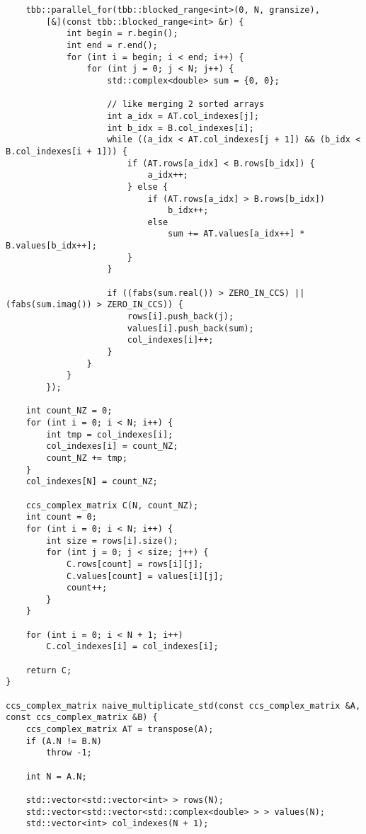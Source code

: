 \documentclass{report}
\begin{document}
\begin{lstlisting}
    tbb::parallel_for(tbb::blocked_range<int>(0, N, gransize),
        [&](const tbb::blocked_range<int> &r) {
            int begin = r.begin();
            int end = r.end();
            for (int i = begin; i < end; i++) {
                for (int j = 0; j < N; j++) {
                    std::complex<double> sum = {0, 0};

                    // like merging 2 sorted arrays
                    int a_idx = AT.col_indexes[j];
                    int b_idx = B.col_indexes[i];
                    while ((a_idx < AT.col_indexes[j + 1]) && (b_idx < B.col_indexes[i + 1])) {
                        if (AT.rows[a_idx] < B.rows[b_idx]) {
                            a_idx++;
                        } else {
                            if (AT.rows[a_idx] > B.rows[b_idx])
                                b_idx++;
                            else
                                sum += AT.values[a_idx++] * B.values[b_idx++];
                        }
                    }

                    if ((fabs(sum.real()) > ZERO_IN_CCS) || (fabs(sum.imag()) > ZERO_IN_CCS)) {
                        rows[i].push_back(j);
                        values[i].push_back(sum);
                        col_indexes[i]++;
                    }
                }
            }
        });

    int count_NZ = 0;
    for (int i = 0; i < N; i++) {
        int tmp = col_indexes[i];
        col_indexes[i] = count_NZ;
        count_NZ += tmp;
    }
    col_indexes[N] = count_NZ;

    ccs_complex_matrix C(N, count_NZ);
    int count = 0;
    for (int i = 0; i < N; i++) {
        int size = rows[i].size();
        for (int j = 0; j < size; j++) {
            C.rows[count] = rows[i][j];
            C.values[count] = values[i][j];
            count++;
        }
    }

    for (int i = 0; i < N + 1; i++)
        C.col_indexes[i] = col_indexes[i];

    return C;
}

ccs_complex_matrix naive_multiplicate_std(const ccs_complex_matrix &A, const ccs_complex_matrix &B) {
    ccs_complex_matrix AT = transpose(A);
    if (A.N != B.N)
        throw -1;

    int N = A.N;

    std::vector<std::vector<int> > rows(N);
    std::vector<std::vector<std::complex<double> > > values(N);
    std::vector<int> col_indexes(N + 1);


\end{lstlisting}
\end{document}
